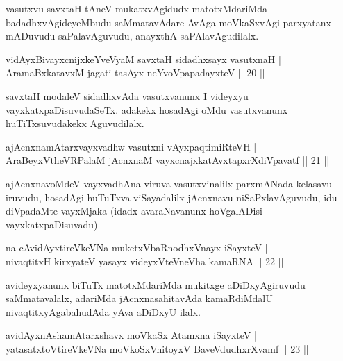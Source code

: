 \begin{artha}
vasutxvu savxtaH tAneV mukatxvAgidudx matotxMdariMda badadhxvAgideyeMbudu saMmatavAdare AvAga moVkaSxvAgi parxyatanx mADuvudu saPalavAguvudu, anayxthA saPAlavAgudilalx.
\end{artha}


\begin{shl}
vidAyx\s BivayxcnijxkeYveVyaM savxtaH sidadhxsayx vasutxnaH |\\
AramaBxkatavxM jagati tasAyx neYvoVpapadayxteV \hfill || 20 ||
\end{shl}

\begin{artha}
savxtaH modaleV sidadhxvAda vasutxvanunx I videyxyu vayxkatxpaDisuvudaSeTx. adakekx hosadAgi oMdu vasutxvanunx huTiTxsuvudakekx Aguvudilalx.
\end{artha}

\begin{shl}
ajAcnxnamAtarxvayxvadhw vasutxni vAyxpaqtimiRteVH |\\
AraBeyxV\s theVR\s PalaM jAcnxnaM vayxcnajxkatAvxtapxrXdiVpavatf \hfill || 21 ||
\end{shl}

\begin{artha}
ajAcnxnavoMdeV vayxvadhAna viruva vasutxvinalilx parxmANada kelasavu iruvudu, hosadAgi huTuTxva viSayadalilx jAcnxnavu niSaPxlavAguvudu, idu diVpadaMte vayxMjaka (idadx avaraNavanunx hoVgalADisi vayxkatxpaDisuvadu)
\end{artha}


\begin{shl}
na cAvidAyxtireVkeVNa muketxVbaRnodhxV\s nayx iSayxteV |\\
nivaqtitxH kirxyateV yasayx videyxVteVneVha kamaRNA \hfill || 22 ||
\end{shl}

\begin{artha}
avideyxyanunx biTuTx matotxMdariMda mukitxge aDiDxyAgiruvudu saMmatavalalx, adariMda jAcnxnasahitavAda kamaRdiMdalU nivaqtitxyAgabahudAda yAva aDiDxyU ilalx.
\end{artha}

\begin{shl}
avidAyxnAshamAtarxshavx moVkaSx Atamxna iSayxteV |\\
yatasatxtoV\s tireVkeVNa moVkoSxV\s nitoyxV BaveVdudhxrXvamf \hfill || 23 ||
\end{shl}

